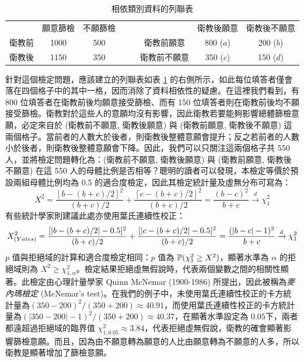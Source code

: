     \begin{table}[htbp]
        \begin{center}
            \begin{tabular}{c|ccccc|cc}
                \cline{1-3}\cline{6-8}
                 & 願意篩檢 & 不願篩檢 &&& & 衛教後願意 & 衛教後不願意\\
                \cline{1-3}\cline{6-8}
                衛教前 & 1000 & 500 &&& 衛教前願意& 800 ($a$) & 200 ($b$)\\
                衛教後 & 1150 & 350 &&& 衛教前不願意& 350 ($c$) & 150 ($d$)\\
                \cline{1-3}\cline{6-8}
            \end{tabular}
            \caption{相依類別資料的列聯表\label{tab:mcnemar_table}}
        \end{center}
    \end{table}

    針對這個檢定問題，應該建立的列聯表如表 \ref{tab:mcnemar_table} 的右側所示，如此每位填答者僅會落在四個格子中的其中一格，因而消除了資料相依性的疑慮。在這裡我們看到，有 800 位填答者在衛教前後均願意接受篩檢、而有 150 位填答者則在衛教前後均不願接受篩檢。衛教對於這些人的意願均沒有影響，因此衛教若要能夠影響總體篩檢意願，必定來自於 (衛教前不願意, 衛教後願意) 與 (衛教前願意, 衛教後不願意) 這兩個格子。當前者的人數大於後者，則衛教後整體意願會提升；反之若前者的人數小於後者，則衛教後整體意願會下降。因此，我們可以只關注這兩個格子共 550 人，並將檢定問題轉化為：(衛教前不願意, 衛教後願意) 與 (衛教前願意, 衛教後不願意) 在這 550 人的母體比例是否相等？聰明的讀者可以發現，本檢定等價於預設兩組母體比例均為 0.5 的適合度檢定，因此其檢定統計量及虛無分布可寫為：
    \[X^2 = \frac{[b-(b+c)/2]^2}{(b+c)/2} + \frac{[c-(b+c)/2]^2}{(b+c)/2} = \frac{(b-c)^2}{b+c} \xrightarrow[]{d} \chi^2_1\]
    有些統計學家則建議此處亦使用葉氏連續性校正：
    \[X^2_{\text(Yates)} = \frac{[|b-(b+c)/2|-0.5]^2}{(b+c)/2} + \frac{[|c-(b+c)/2|-0.5]^2}{(b+c)/2} = \frac{(|b-c|-1)^2}{b+c} \xrightarrow[]{d} \chi^2_1\]
    $p$ 值與拒絕域的計算和適合度檢定相同：$p$ 值為 $\mathbb{P}(\chi^2_1 \ge X^2)$，顯著水準為 $\alpha$ 的拒絕域則為 $X^2 \ge \chi^2_{1, \alpha}$。檢定結果拒絕虛無假說時，代表兩個變數之間的相關性顯著。此檢定由心理計量學家 Quinn McNemar (1900-1986) 所提出，因此被稱為\textit{麥內瑪檢定} (McNemar's test)。在我們的例子中，未使用葉氏連續性校正的卡方統計量為$(350-200)^2/(350+200) \approx 40.91$，而使用葉氏連續性校正的卡方統計量為$(|350-200|-1)^2/(350+200) \approx 40.37$，在顯著水準設定為 $0.05$下，兩者都遠超過拒絕域的臨界值 $\chi^2_{1,0.05} \approx 3.84$，代表拒絕虛無假說，衛教的確會顯著影響篩檢意願。而且，因為由不願意轉為願意的人比由願意轉為不願意的人多，所以衛教是顯著增加了篩檢意願。

